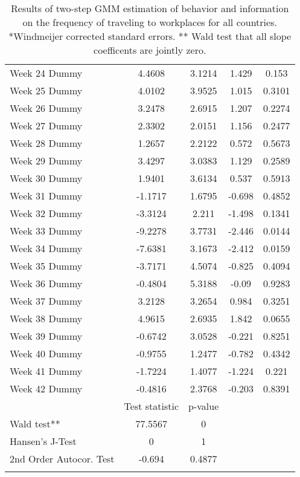 \begin{longtable}{lcccc}
  Week 24 Dummy & 4.4608 & 3.1214 & 1.429 & 0.153 \\ 
  Week 25 Dummy & 4.0102 & 3.9525 & 1.015 & 0.3101 \\ 
  Week 26 Dummy & 3.2478 & 2.6915 & 1.207 & 0.2274 \\ 
  Week 27 Dummy & 2.3302 & 2.0151 & 1.156 & 0.2477 \\ 
  Week 28 Dummy & 1.2657 & 2.2122 & 0.572 & 0.5673 \\ 
  Week 29 Dummy & 3.4297 & 3.0383 & 1.129 & 0.2589 \\ 
  Week 30 Dummy & 1.9401 & 3.6134 & 0.537 & 0.5913 \\ 
  Week 31 Dummy & -1.1717 & 1.6795 & -0.698 & 0.4852 \\ 
  Week 32 Dummy & -3.3124 & 2.211 & -1.498 & 0.1341 \\ 
  Week 33 Dummy & -9.2278 & 3.7731 & -2.446 & 0.0144 \\ 
  Week 34 Dummy & -7.6381 & 3.1673 & -2.412 & 0.0159 \\ 
  Week 35 Dummy & -3.7171 & 4.5074 & -0.825 & 0.4094 \\ 
  Week 36 Dummy & -0.4804 & 5.3188 & -0.09 & 0.9283 \\ 
  Week 37 Dummy & 3.2128 & 3.2654 & 0.984 & 0.3251 \\ 
  Week 38 Dummy & 4.9615 & 2.6935 & 1.842 & 0.0655 \\ 
  Week 39 Dummy & -0.6742 & 3.0528 & -0.221 & 0.8251 \\ 
  Week 40 Dummy & -0.9755 & 1.2477 & -0.782 & 0.4342 \\ 
  Week 41 Dummy & -1.7224 & 1.4077 & -1.224 & 0.221 \\ 
  Week 42 Dummy & -0.4816 & 2.3768 & -0.203 & 0.8391 \\ 
   & Test statistic & p-value &  &  \\ 
  Wald test** & 77.5567 & 0 &  &  \\ 
  Hansen's J-Test & 0 & 1 &  &  \\ 
  2nd Order Autocor. Test & -0.694 & 0.4877 &  &  \\ 
   \bottomrule
\caption{Results of two-step GMM estimation of behavior and information on the frequency of traveling to workplaces for all countries. *Windmeijer corrected standard errors. ** Wald test that all slope coefficents are jointly zero.} 
\label{tab_results:workplaces_full}
\end{longtable}
\endgroup
